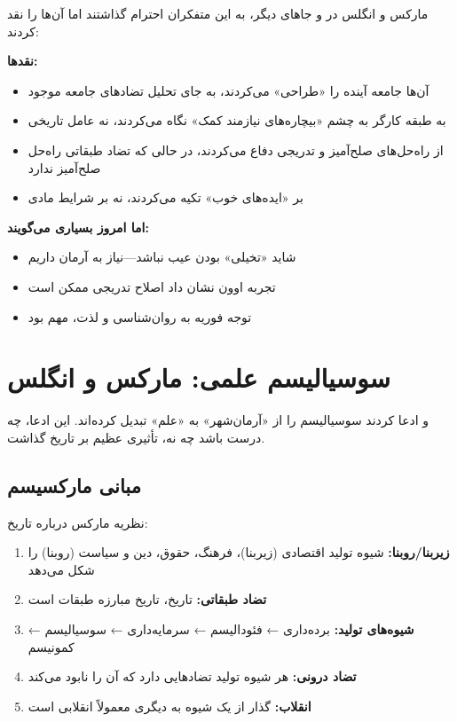 \begin{debatebox}
مارکس و انگلس در  و جاهای دیگر، به این متفکران احترام گذاشتند اما آن‌ها را نقد کردند:

\textbf{نقدها:}
\begin{itemize}[nosep]
    \item آن‌ها جامعه آینده را «طراحی» می‌کردند، به جای تحلیل تضادهای جامعه موجود
    \item به طبقه کارگر به چشم «بیچاره‌های نیازمند کمک» نگاه می‌کردند، نه عامل تاریخی
    \item از راه‌حل‌های صلح‌آمیز و تدریجی دفاع می‌کردند، در حالی که تضاد طبقاتی راه‌حل صلح‌آمیز ندارد
    \item بر «ایده‌های خوب» تکیه می‌کردند، نه بر شرایط مادی
\end{itemize}

\textbf{اما امروز بسیاری می‌گویند:}
\begin{itemize}[nosep]
    \item شاید «تخیلی» بودن عیب نباشد—نیاز به آرمان داریم
    \item تجربه اوون نشان داد اصلاح تدریجی ممکن است
    \item توجه فوریه به روان‌شناسی و لذت، مهم بود
\end{itemize}
\end{debatebox}

\section{سوسیالیسم علمی: مارکس و انگلس}

 و  ادعا کردند سوسیالیسم را از «آرمان‌شهر» به «علم» تبدیل کرده‌اند. این ادعا، چه درست باشد چه نه، تأثیری عظیم بر تاریخ گذاشت.

\subsection{مبانی مارکسیسم}

\begin{defbox}
نظریه مارکس درباره تاریخ:
\begin{enumerate}[nosep]
    \item \textbf{زیربنا/روبنا:} شیوه تولید اقتصادی (زیربنا)، فرهنگ، حقوق، دین و سیاست (روبنا) را شکل می‌دهد
    \item \textbf{تضاد طبقاتی:} تاریخ، تاریخ مبارزه طبقات است
    \item \textbf{شیوه‌های تولید:} برده‌داری ← فئودالیسم ← سرمایه‌داری ← سوسیالیسم ← کمونیسم
    \item \textbf{تضاد درونی:} هر شیوه تولید تضادهایی دارد که آن را نابود می‌کند
    \item \textbf{انقلاب:} گذار از یک شیوه به دیگری معمولاً انقلابی است
\end{enumerate}
\end{defbox}

